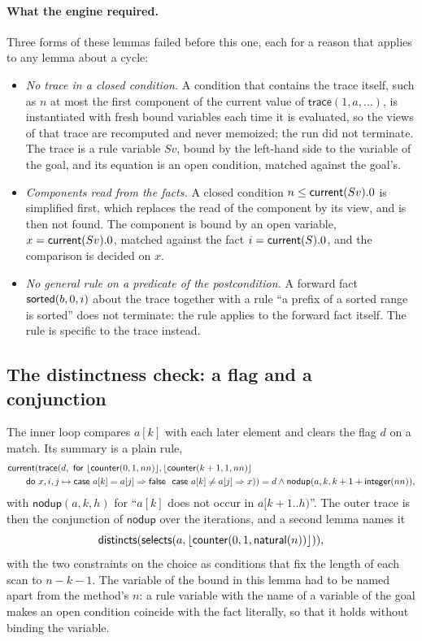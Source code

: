 \paragraph{What the engine required.} Three forms of these lemmas failed before this one, each for a reason that
applies to any lemma about a cycle:
\begin{itemize}[nosep]
\item \emph{No trace in a closed condition.} A condition that contains the trace itself, such as $n$ at most the
  first component of the current value of $\mathsf{trace}(1, a, \ldots)$, is instantiated with fresh bound variables each time it is evaluated, so the
  views of that trace are recomputed and never memoized; the run did not terminate. The trace is a rule variable
  $Sv$, bound by the left-hand side to the variable of the goal, and its equation is an open condition, matched
  against the goal's.
\item \emph{Components read from the facts.} A closed condition $n \le \mathsf{current}(Sv).0$ is simplified first, which replaces
  the read of the component by its view, and is then not found. The component is bound by an open variable,
  $x = \mathsf{current}(Sv).0$, matched against the fact $i = \mathsf{current}(S).0$, and the comparison is decided on $x$.
\item \emph{No general rule on a predicate of the postcondition.} A forward fact $\mathsf{sorted}(b, 0, i)$ about the trace
  together with a rule ``a prefix of a sorted range is sorted'' does not terminate: the rule applies to the forward
  fact itself. The rule is specific to the trace instead.
\end{itemize}

\subsection{The distinctness check: a flag and a conjunction}\label{sec:sorts:distinct}
The inner loop compares $a[k]$ with each later element and clears the flag $d$ on a match. Its summary is a plain rule,
\begin{align*}
  &\mathsf{current}(\mathsf{trace}(d,\ \mathsf{for}\ \lfloor \mathsf{counter}(0, 1, nn)\rfloor, \lfloor \mathsf{counter}(k + 1, 1, nn)\rfloor\\
  &\qquad \mathsf{do}\ x, i, j \mapsto \mathsf{case}\ a[k] = a[j] \Rightarrow \mathsf{false}\ \ \mathsf{case}\ a[k] \ne a[j] \Rightarrow x))
   = d \wedge \mathsf{nodup}(a, k, k + 1 + \mathsf{integer}(nn)),
\end{align*}
with $\mathsf{nodup}(a, k, h)$ for ``$a[k]$ does not occur in $a[k + 1..h)$''. The outer trace is then the conjunction of
$\mathsf{nodup}$ over the iterations, and a second lemma names it
\[ \mathsf{distincts}(\mathsf{selects}(a, \lfloor \mathsf{counter}(0, 1, \mathsf{natural}(n))\rfloor)), \]
with the two constraints on the choice as conditions that fix the length of each scan to $n - k - 1$. The variable of
the bound in this lemma had to be named apart from the method's $n$: a rule variable with the name of a variable of the
goal makes an open condition coincide with the fact literally, so that it holds without binding the variable.

